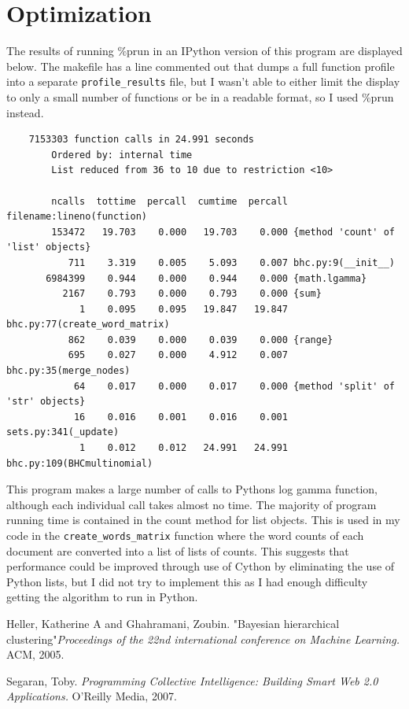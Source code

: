 \documentclass{article}
\begin{document}
\section{Optimization}
The results of running \%prun in an IPython version of this program are displayed below.  The makefile has a line commented out that dumps a full function
profile into a separate \texttt{profile\_results} file, but I wasn't able to either limit the display to only a small number of functions or be in a readable format, so I used \%prun instead.
\begin{verbatim}
    7153303 function calls in 24.991 seconds
        Ordered by: internal time
        List reduced from 36 to 10 due to restriction <10>

        ncalls  tottime  percall  cumtime  percall filename:lineno(function)
        153472   19.703    0.000   19.703    0.000 {method 'count' of 'list' objects}
           711    3.319    0.005    5.093    0.007 bhc.py:9(__init__)
       6984399    0.944    0.000    0.944    0.000 {math.lgamma}
          2167    0.793    0.000    0.793    0.000 {sum}
             1    0.095    0.095   19.847   19.847 bhc.py:77(create_word_matrix)
           862    0.039    0.000    0.039    0.000 {range}
           695    0.027    0.000    4.912    0.007 bhc.py:35(merge_nodes)
            64    0.017    0.000    0.017    0.000 {method 'split' of 'str' objects}
            16    0.016    0.001    0.016    0.001 sets.py:341(_update)
             1    0.012    0.012   24.991   24.991 bhc.py:109(BHCmultinomial)
\end{verbatim}
This program makes a large number of calls to Pythons log gamma function, although each individual call takes almost no time.  The majority of program running time is contained in the count method for list objects.  This is used in my code in the \texttt{create\_words\_matrix} function where the word counts of each document are converted into a list of lists of counts.  This suggests that performance could be improved through use of Cython by eliminating the use of Python lists, but I did not try to implement this as I had enough difficulty getting the algorithm to run in Python.

\begin{thebibliography}{1}

     Heller, Katherine A and Ghahramani, Zoubin. "Bayesian hierarchical clustering"{\em Proceedings of the 22nd international conference on Machine Learning.} ACM, 2005.
  
     Segaran, Toby.  {\em Programming Collective Intelligence: Building Smart Web 2.0 Applications.} O'Reilly Media, 2007.
\end{thebibliography}
\end{document}
